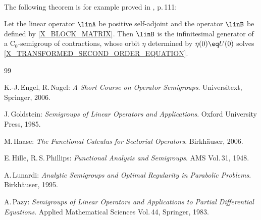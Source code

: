 \documentclass[11pt,twoside]{article}
\begin{document}
\paragraph{} %
The following theorem is for example proved in \cite{X_Go}, p.\,111:

\begin{theorem1}\label{LUMER-PHILLIPS_THEOREM_2}
Let the linear operator $\linA$ be positive self-adjoint
and the operator $\linB$ be defined by \eqref{X_BLOCK_MATRIX}.
Then $\linB$ is the infinitesimal generator of a C$_0$-semigroup 
of contractions,
whose orbit $\eta$ determined by $\eta(0) \eq U(0)$ solves
\eqref{X_TRANSFORMED_SECOND_ORDER_EQUATION}.
\end{theorem1}

\vspace{5mm}
\begin{thebibliography}{99}
\begin{small}

  K.-J.\,Engel, R.\,Nagel:
\textit{A Short Course on Operator Semigroups}.
Universitext, Springer, 2006.

 J.\,Goldstein:
\textit{Semigroups of Linear Operators and Applications}.
Oxford University Press, 1985.

 M.\,Haase:
\textit{The Functional Calculus for Sectorial Operators}.
Birk\-h\"{a}user, 2006.

 E.\,Hille, R.\,S.\,Phillips:
\textit{Functional Analysis and Semigroups}.
AMS Vol.\,31, 1948.

 A.\,Lunardi:
\textit{Analytic Semigroups and Optimal Regularity in Parabolic Problems}.
Birk\-h\"{a}user, 1995.

 A.\,Pazy:
\textit{Semigroups of Linear Operators
        and Applications to Partial Differential Equations}.
Applied Mathematical Sciences Vol.\,44, Springer, 1983.

\end{small}
\end{thebibliography}

\end{document}
